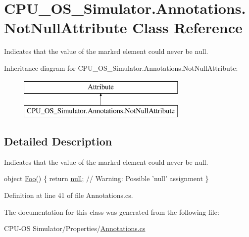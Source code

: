 \hypertarget{class_c_p_u___o_s___simulator_1_1_annotations_1_1_not_null_attribute}{}\section{C\+P\+U\+\_\+\+O\+S\+\_\+\+Simulator.\+Annotations.\+Not\+Null\+Attribute Class Reference}
\label{class_c_p_u___o_s___simulator_1_1_annotations_1_1_not_null_attribute}


Indicates that the value of the marked element could never be {\ttfamily null}.  


Inheritance diagram for C\+P\+U\+\_\+\+O\+S\+\_\+\+Simulator.\+Annotations.\+Not\+Null\+Attribute\+:\begin{figure}[H]
\begin{center}
\leavevmode
\includegraphics[height=2.000000cm]{class_c_p_u___o_s___simulator_1_1_annotations_1_1_not_null_attribute}
\end{center}
\end{figure}


\subsection{Detailed Description}
Indicates that the value of the marked element could never be {\ttfamily null}. 


\begin{DoxyCode}
[NotNull] \textcolor{keywordtype}{object} \hyperlink{_annotations_8cs_a710c2378b43f44cd4a9b365c85be5d6c}{Foo}() \{
  \textcolor{keywordflow}{return} \hyperlink{_old_01_process_01_flags_8cs_afb8e110345c45e74478894341ab6b28e}{null}; \textcolor{comment}{// Warning: Possible 'null' assignment}
\}
\end{DoxyCode}


Definition at line 41 of file Annotations.\+cs.



The documentation for this class was generated from the following file\+:\begin{DoxyCompactItemize}
\item 
C\+P\+U-\/\+O\+S Simulator/\+Properties/\hyperlink{_annotations_8cs}{Annotations.\+cs}\end{DoxyCompactItemize}
